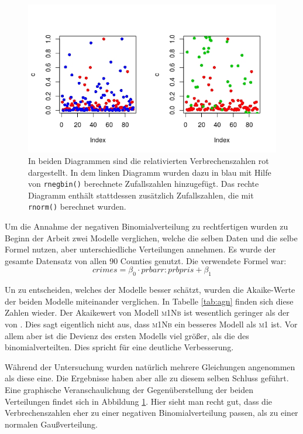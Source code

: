 \begin{figure}
\centering
\includegraphics[scale=0.7]{./jpgs/rnegbin.jpeg}
\caption{In beiden Diagrammen sind die relativierten Verbrechenszahlen rot dargestellt.
		 In dem linken Diagramm wurden dazu in blau mit Hilfe von \texttt{rnegbin()} berechnete     Zufallszahlen hinzugef\"ugt.
		 Das rechte Diagramm enth\"alt stattdessen zus\"atzlich Zufallszahlen, die mit \texttt{rnorm()} berechnet wurden.}
\label{fig:nbd}
\end{figure}
\par\smallskip

Um die Annahme der negativen Binomialverteilung zu rechtfertigen wurden zu Beginn der Arbeit zwei Modelle verglichen, welche die selben Daten und die selbe Formel nutzen, aber unterschiedliche Verteilungen annehmen.
Es wurde der gesamte Datensatz von allen 90 Counties genutzt.
Die verwendete Formel war:
\begin{equation}
crimes = \beta_0 \cdot prbarr:prbpris + \beta_1
\end{equation}

Un zu entscheiden, welches der Modelle besser sch\"atzt, wurden die Akaike-Werte der beiden Modelle miteinander verglichen.
In Tabelle \ref{tab:agn} finden sich diese Zahlen wieder.
Der Akaikewert von Modell \textsc{m1Nb} ist wesentlich geringer als der von .
Dies sagt eigentlich nicht aus, dass \textsc{m1Nb} ein besseres Modell als \textsc{m1} ist.
Vor allem aber ist die Devienz des ersten Modells viel gr\"o\ss{}er, als die des binomialverteilten.
Dies spricht f\"ur eine deutliche Verbesserung.
\par\smallskip
W\"ahrend der Untersuchung wurden nat\"urlich mehrere Gleichungen angenommen als diese eine.
Die Ergebnisse haben aber alle zu diesem selben Schluss gef\"uhrt.
Eine graphische Veranschaulichung der Gegen\"uberstellung der beiden Verteilungen findet sich in Abbildung \ref{fig:nbd}.
Hier sieht man recht gut, dass die Verbrechenszahlen eher zu einer negativen Binomialverteilung passen, als zu einer normalen Gau\ss{}verteilung.
  

